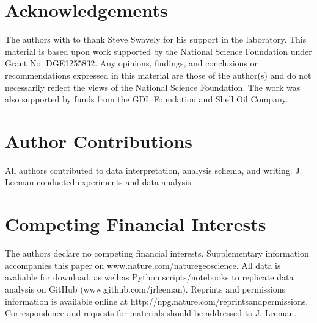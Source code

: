 \documentclass[11pt]{article}
\begin{document}


\section{Acknowledgements}
The authors with to thank Steve Swavely for his support in the laboratory. This
material is based upon work supported by the National Science Foundation under
Grant No. DGE1255832.  Any opinions, findings, and conclusions or
recommendations expressed in this material are those of the author(s) and do not
necessarily reflect the views of the National Science Foundation. The work was
also supported by funds from the GDL Foundation and Shell Oil Company.

\section{Author Contributions}
All authors contributed to data interpretation, analysis schema, and writing.
J. Leeman conducted experiments and data analysis.

\section{Competing Financial Interests}
The authors declare no competing financial interests. Supplementary information
accompanies this paper on www.nature.com/naturegeoscience. All data is avaliable
for download, as well as Python scripts/notebooks to replicate data analysis on
GitHub (www.github.com/jrleeman). Reprints and permissions information is
available online at http://npg.nature.com/reprintsandpermissions. Correspondence
and requests for materials should be addressed to J. Leeman.
\end{document}
